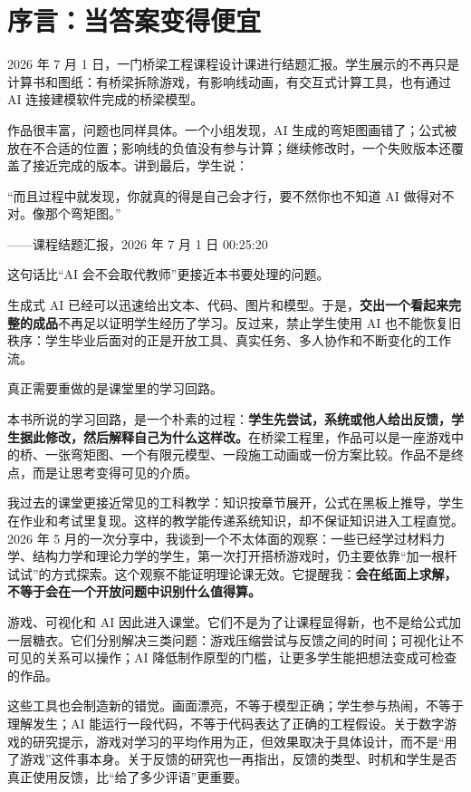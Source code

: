\chapter*{序言：当答案变得便宜}

2026 年 7 月 1 日，一门桥梁工程课程设计课进行结题汇报。学生展示的不再只是计算书和图纸：有桥梁拆除游戏，有影响线动画，有交互式计算工具，也有通过 AI 连接建模软件完成的桥梁模型。

作品很丰富，问题也同样具体。一个小组发现，AI 生成的弯矩图画错了；公式被放在不合适的位置；影响线的负值没有参与计算；继续修改时，一个失败版本还覆盖了接近完成的版本。讲到最后，学生说：

\begin{shiyu-inline}
``而且过程中就发现，你就真的得是自己会才行，要不然你也不知道 AI 做得对不对。像那个弯矩图。''

\hfill ——课程结题汇报，2026 年 7 月 1 日 00:25:20
\end{shiyu-inline}

这句话比“AI 会不会取代教师”更接近本书要处理的问题。

生成式 AI 已经可以迅速给出文本、代码、图片和模型。于是，\textbf{交出一个看起来完整的成品}不再足以证明学生经历了学习。反过来，禁止学生使用 AI 也不能恢复旧秩序：学生毕业后面对的正是开放工具、真实任务、多人协作和不断变化的工作流。

真正需要重做的是课堂里的学习回路。

本书所说的学习回路，是一个朴素的过程：\textbf{学生先尝试，系统或他人给出反馈，学生据此修改，然后解释自己为什么这样改。}在桥梁工程里，作品可以是一座游戏中的桥、一张弯矩图、一个有限元模型、一段施工动画或一份方案比较。作品不是终点，而是让思考变得可见的介质。

我过去的课堂更接近常见的工科教学：知识按章节展开，公式在黑板上推导，学生在作业和考试里复现。这样的教学能传递系统知识，却不保证知识进入工程直觉。2026 年 5 月的一次分享中，我谈到一个不太体面的观察：一些已经学过材料力学、结构力学和理论力学的学生，第一次打开搭桥游戏时，仍主要依靠“加一根杆试试”的方式探索。这个观察不能证明理论课无效。它提醒我：\textbf{会在纸面上求解，不等于会在一个开放问题中识别什么值得算。}

游戏、可视化和 AI 因此进入课堂。它们不是为了让课程显得新，也不是给公式加一层糖衣。它们分别解决三类问题：游戏压缩尝试与反馈之间的时间；可视化让不可见的关系可以操作；AI 降低制作原型的门槛，让更多学生能把想法变成可检查的作品。

这些工具也会制造新的错觉。画面漂亮，不等于模型正确；学生参与热闹，不等于理解发生；AI 能运行一段代码，不等于代码表达了正确的工程假设。关于数字游戏的研究提示，游戏对学习的平均作用为正，但效果取决于具体设计，而不是“用了游戏”这件事本身\cite{clark2016games}。关于反馈的研究也一再指出，反馈的类型、时机和学生是否真正使用反馈，比“给了多少评语”更重要\cite{shute2008feedback,carless2018literacy}。

